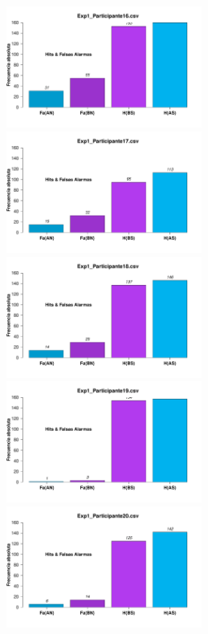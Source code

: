 \documentclass[a4paper ]{article}
\begin{document}
\begin{figure}[th]
\begin{center}
\includegraphics[width=8cm, height=4cm]{Figures/MirrorRate_Exp1_P16} \includegraphics[width=8cm, height=4cm]{Figures/MirrorRate_Exp1_P17} \includegraphics[width=8cm, height=4cm]{Figures/MirrorRate_Exp1_P18}
\includegraphics[width=8cm, height=4cm]{Figures/MirrorRate_Exp1_P19} \includegraphics[width=8cm, height=4cm]{Figures/MirrorRate_Exp1_P20} 
\end{center}
\end{figure}
\clearpage
\end{document}
